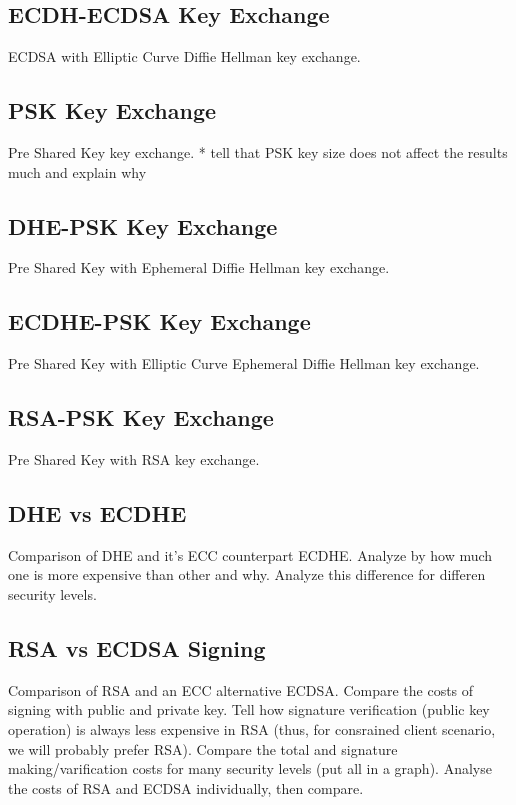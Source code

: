 \documentclass{llncs}
\begin{document}
\subsection{ECDH-ECDSA Key Exchange}

ECDSA with Elliptic Curve Diffie Hellman key exchange.

\subsection{PSK Key Exchange}

Pre Shared Key key exchange.
* tell that PSK key size does not affect the results much and explain why

\subsection{DHE-PSK Key Exchange}

Pre Shared Key with Ephemeral Diffie Hellman key exchange.

\subsection{ECDHE-PSK Key Exchange}

Pre Shared Key with Elliptic Curve Ephemeral Diffie Hellman key exchange.

\subsection{RSA-PSK Key Exchange}

Pre Shared Key with RSA key exchange.


\subsection{DHE vs ECDHE}

Comparison of DHE and it's ECC counterpart ECDHE. Analyze by how much one is more expensive than other and why.
Analyze this difference for differen security levels.

\subsection{RSA vs ECDSA Signing}

Comparison of RSA and an ECC alternative ECDSA. Compare the costs of signing with public and private key.
Tell how signature verification (public key operation) is always less expensive in RSA (thus, for consrained client
scenario, we will probably prefer RSA). Compare the total and signature making/varification costs for many security
levels (put all in a graph). Analyse the costs of RSA and ECDSA individually, then compare.
\end{document}
